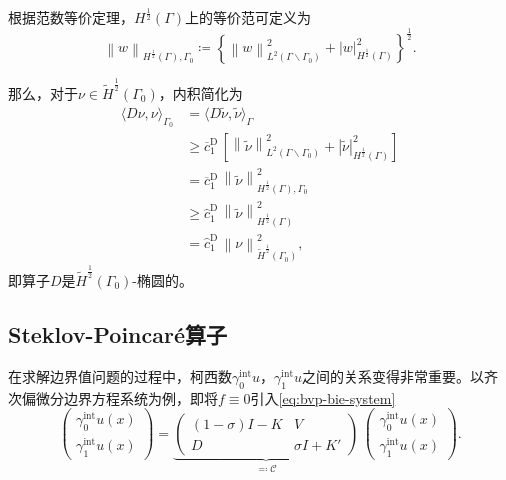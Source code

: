 根据范数等价定理，$H^{\frac{1}{2}}(\Gamma)$上的等价范可定义为
\begin{equation*}
  \left\| w \right\|_{H^{\frac{1}{2}}(\Gamma), \Gamma_{0}}
  \coloneqq
  \left\{
  \left\| w \right\|_{L^{2}(\Gamma \backslash \Gamma_{0})}^{2}
  + \left| w \right|_{H^{\frac{1}{2}}(\Gamma)}^{2}
  \right\}^{\frac{1}{2}}.
\end{equation*}

那么，对于$\nu \in \widetilde{H}^{\frac{1}{2}}(\Gamma_{0})$，内积简化为
\begin{equation}
  \label{eq:bvp-bie-hyper-ellipticity-subspace}
  \begin{split}
    \langle D \nu, \nu \rangle_{\Gamma_{0}}
    & = \langle D \widetilde{\nu}, \widetilde{\nu} \rangle_{\Gamma} \\
    & \ge \overline{c}_{1}^{\text{D}} \,
    \left[
    \left\| \widetilde{\nu} \right\|_{L^{2}(\Gamma \backslash \Gamma_{0})}^{2}
    + \left| \widetilde{\nu} \right|_{H^{\frac{1}{2}}(\Gamma)}^{2}
    \right] \\
    & = \overline{c}_{1}^{\text{D}} \,
    \left\| \widetilde{\nu} \right\|_{H^{\frac{1}{2}}(\Gamma), \Gamma_{0}}^{2} \\
    & \ge \widehat{c}_{1}^{\text{D}} \,
    \left\| \widetilde{\nu} \right\|_{H^{\frac{1}{2}}(\Gamma)}^{2} \\
    & = \widehat{c}_{1}^{\text{D}} \,
    \left\| \nu \right\|_{\widetilde{H}^{\frac{1}{2}}(\Gamma_{0})}^{2},
  \end{split}
\end{equation}
即算子$D$是$\widetilde{H}^{\frac{1}{2}}(\Gamma_{0})$-椭圆的。

\subsection{Steklov-Poincaré算子}
\label{sec:steklov-poincare-operator}

在求解边界值问题的过程中，柯西数$\gamma_{0}^{\text{int}} u$，$\gamma_{1}^{\text{int}} u$之间的关系变得非常重要。以齐次偏微分边界方程系统为例，即将$f \equiv 0$引入\eqref{eq:bvp-bie-system}
\begin{equation}
\label{eq:bvp-bie-system-spoperator}
  \begin{pmatrix}
    \gamma_{0}^{\text{int}} u(x) \\
    \gamma_{1}^{\text{int}} u(x)
  \end{pmatrix}
  =
  \underbrace{
  \begin{pmatrix}
    \left( 1-\sigma \right) I - K & V \\
    D & \sigma I + K'
  \end{pmatrix}
  }_{\eqqcolon \mathcal{C}}
  \,
  \begin{pmatrix}
    \gamma_{0}^{\text{int}} u(x)\\
    \gamma_{1}^{\text{int}} u(x)
  \end{pmatrix}.
\end{equation}

